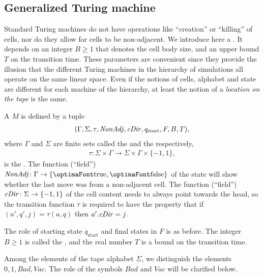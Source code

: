 \documentclass[12pt]{memoir}
\renewcommand{\ge}{\geq}
\newcommand{\fld}[1]{\ensuremath{\textit{#1\/}}}
\def\B{B}
\newcommand{\Bad}{\mathit{Bad}}
\newcommand{\Vacant}{\mathit{Vac}}
\newcommand{\Tu}{T}
\newcommand{\cDir}{\fld{cDir}}
\newcommand{\NonAdj}{\fld{NonAdj}}
\newcommand{\start}{\mathrm{start}}
\begin{document}
\subsection{Generalized Turing machine}

Standard Turing machines do not have
operations like ``creation'' or ``killing'' of cells, nor
do they allow for cells to be non-adjacent.
We introduce here a .
It depends on an integer \( \B \ge 1 \) that denotes the cell body size,
and an upper bound \( \Tu \) on the transition time.
These parameters are convenient since they provide the illusion that the different Turing
machines in the hierarchy of simulations all operate on the same linear space.
Even if the notions of cells, alphabet
and state are different for each machine of the hierarchy, 
at least the notion of a \emph{location
on the tape} is the same.


\begin{definition}\label{def:gen-TM}
    A  \( M \) is defined by a tuple
        \begin{align}\label{eq:gen-TM}
             (\Gamma, \Sigma, \tau, \NonAdj, \cDir, q_{\start},F, \B, \Tu),
       \end{align}
    where \( \Gamma \) and \( \Sigma \) are finite sets
    called the  and the  respectively,
        \begin{align*}
             \tau: \Sigma\times \Gamma
             \to \Sigma\times \Gamma\times\{-1,1\},
        \end{align*}
    is the .
The function (``field'') \( \NonAdj\colon\Gamma\to\{\true,\false\} \) of the 
state will show whether the last move was from a non-adjacent cell.
The function (``field'') \( \cDir\colon\Sigma\to\{-1,1\} \) of the cell content
needs to always point towards the head, so 
the transition function \( \tau \) is required to have the property that
if \( (a',q',j)=\tau(a,q) \) then \( a'.\cDir=j \).

The role of starting state \( q_{\start} \) and final states in \( F \) is as before.
The integer \( \B\ge 1 \) is called the ,
and the real number \( \Tu \) is a bound on the transition time.

Among the elements of the tape alphabet \( \Sigma \), 
we distinguish the elements \( 0,1,\Bad,\Vacant \).
The role of the symbols \( \Bad \) and \( \Vacant \) will be clarified below.
\end{definition}
\end{document}
